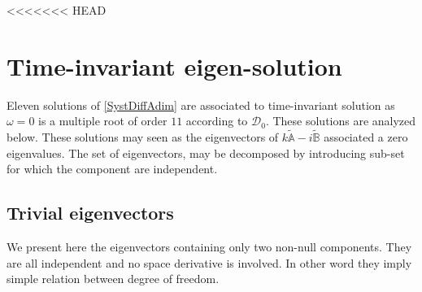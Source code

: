 \documentclass[
10pt, %
a4paper, %
oneside, %
headinclude,footinclude, %
table
]{scrartcl}
\begin{document}
<<<<<<< HEAD
\section{Time-invariant  eigen-solution}
Eleven solutions of \eqref{SystDiffAdim} are associated to time-invariant solution as $\omega=0$ is 
a multiple root of order $11$ according to $\mathcal{D}_{0}$. These solutions are analyzed below. 
These solutions may seen as the eigenvectors of $k\tilde{\mathbb{A}}-i\tilde{\mathbb{B}}$ 
associated a zero eigenvalues. The set of eigenvectors, may be decomposed by introducing sub-set 
for which the component are independent. 
\subsection{Trivial eigenvectors}
We present here the eigenvectors containing only two non-null components. They are all independent and no space derivative is involved. In other word they imply simple relation between degree of freedom. 
\end{document}
